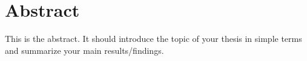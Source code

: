 \chapter{Abstract}

This is the abstract.
It should introduce the topic of your thesis in simple terms and summarize your main results/findings.
